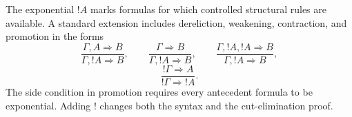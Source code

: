The exponential \(!A\) marks formulas for which controlled structural rules
are available.  A standard extension includes dereliction, weakening,
contraction, and promotion in the forms
\[
\frac{\Gamma,A\Rightarrow B}{\Gamma,!A\Rightarrow B},
\qquad
\frac{\Gamma\Rightarrow B}{\Gamma,!A\Rightarrow B},
\qquad
\frac{\Gamma,!A,!A\Rightarrow B}{\Gamma,!A\Rightarrow B},
\]
\[
  \frac{!\Gamma\Rightarrow A}{!\Gamma\Rightarrow !A}.
\]
The side condition in promotion requires every antecedent formula to be
exponential.  Adding \(!\) changes both the syntax and the cut-elimination
proof.

